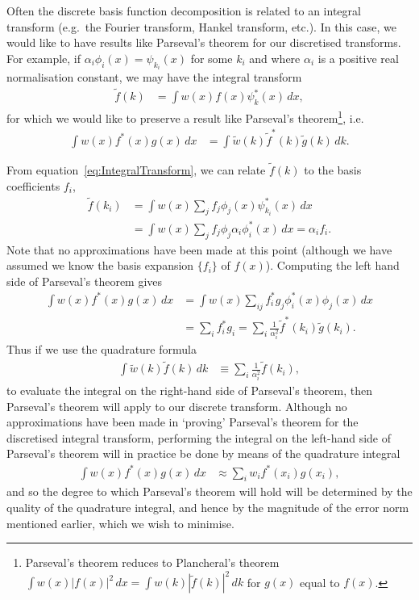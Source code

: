 \documentclass[aip,amsmath,amssymb,reprint,twocolumn]{revtex4-1}
\begin{document}
Often the discrete basis function decomposition is related to an integral transform (e.g.\ the Fourier transform, Hankel transform, etc.).  In this case, we would like to have results like Parseval's theorem for our discretised transforms.  For example, if $\alpha_i \phi_i(x) =  \psi_{k_i}(x)$ for some $k_i$ and where $\alpha_i$ is a positive real normalisation constant, we may have the integral transform
\begin{align}
  \tilde{f}(k) &= \int w(x) f(x) \psi^*_k(x)\, dx, \label{eq:IntegralTransform}
\end{align}
for which we would like to preserve a result like Parseval's theorem\footnote{Parseval's theorem reduces to Plancheral's theorem $\int w(x) |f(x)|^2\, dx = \int w(k) |\tilde{f}(k)|^2\, dk$ for $g(x)$ equal to $f(x)$.}, i.e.
\begin{align}
  \int w(x) f^*(x) g(x)\, dx &= \int \tilde{w}(k) \tilde{f}^*(k) \tilde{g}(k)\, dk.
\end{align}

From equation~\eqref{eq:IntegralTransform}, we can relate $\tilde{f}(k)$ to the basis coefficients $f_i$,
\begin{align}
  \tilde{f}(k_i) &= \int w(x) \sum_j f_j \phi_j(x) \psi_{k_i}^*(x) \, dx \\
  &= \int w(x) \sum_j f_j \phi_j \alpha_i \phi_i^*(x)\, dx = \alpha_i f_i.
\end{align}
Note that no approximations have been made at this point (although we have assumed we know the basis expansion $\{f_i\}$ of $f(x)$).  Computing the left hand side of Parseval's theorem gives
\begin{align}
  \int w(x) f^*(x) g(x)\, dx &= \int w(x) \sum_{ij} f_i^* g_j \phi_i^*(x) \phi_j(x)\, dx\\
   &= \sum_i f_i^* g_i = \sum_i \frac{1}{\alpha_i^2} \tilde{f}^*(k_i) \tilde{g}(k_i).
\end{align}
Thus if we use the quadrature formula
\begin{align}
  \int \tilde{w}(k) \tilde{f}(k) \, dk &\equiv \sum_i \frac{1}{\alpha_i^2} \tilde{f}(k_i),
\end{align}
to evaluate the integral on the right-hand side of Parseval's theorem, then Parseval's theorem will apply to our discrete transform.  Although no approximations have been made in `proving' Parseval's theorem for the discretised integral transform, performing the integral on the left-hand side of Parseval's theorem will in practice be done by means of the quadrature integral
\begin{align}
  \int w(x) f^*(x) g(x)\, dx &\approx \sum_i w_i f^*(x_i) g(x_i),
\end{align}
and so the degree to which Parseval's theorem will hold will be determined by the quality of the quadrature integral, and hence by the magnitude of the error norm mentioned earlier, which we wish to minimise.
\end{document}
